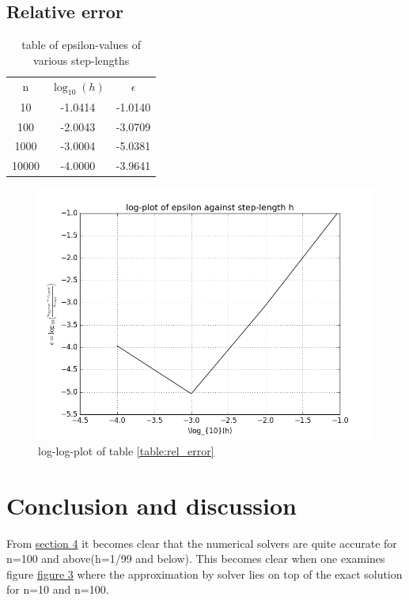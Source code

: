 \documentclass[11pt,a4paper,notitlepage]{article}
\begin{document}
\subsection{Relative error}
	\begin{table}[H]
	\centering
		\label{table:relerror}
		\begin{tabular}{|c|c|c|} \hline
			n & $\log_{10}(h)$ & $\epsilon$ \\
			10 & -1.0414 & -1.0140 \\
			100 & -2.0043 & -3.0709 \\	
			1000 & -3.0004 & -5.0381 \\
			10000 & -4.0000 & -3.9641 \\ \hline
		\end{tabular}
		\caption{table of epsilon-values of various step-lengths}
	\end{table}
	\begin{figure}[H]
		\label{fig:relerror}
		\includegraphics[scale=0.7]{../img/epsilon.png}
		\caption{log-log-plot of table \ref{table:rel_error}}
	\end{figure}
	
\section{Conclusion and discussion}
From \hyperref[section:results]{section 4} it becomes clear that the numerical solvers are quite accurate for n=100 and above(h=1/99 and below). This becomes clear when one examines figure \hyperref[fig:compare_gen_exact]{figure 3} where the approximation by solver lies on top of the exact solution for n=10 and n=100.
	
\end{document}
